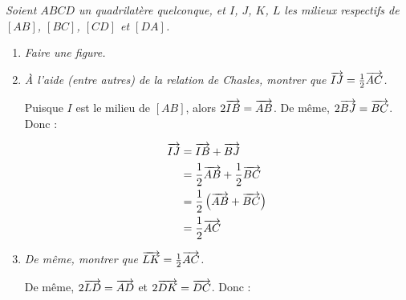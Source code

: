 \documentclass[12pt]{article}
\begin{document}
\pagebreak

\begin{exercice}[Vecteurs]
  \emph{Soient $ABCD$ un quadrilatère quelconque, et $I$, $J$, $K$, $L$ les milieux respectifs de $[AB]$, $\left[ BC \right]$, $\left[ CD \right]$ et $\left[ DA \right]$.}

  \begin{enumerate}
    \item \emph{Faire une figure.}
      \begin{center}
      \end{center}
    \item \emph{À l'aide (entre autres) de la relation de Chasles, montrer que $\overrightarrow{IJ}=\frac{1}{2}\overrightarrow{AC}$.}
      \begin{multicols}{2}
      Puisque $I$ est le milieu de $\left[ AB \right]$, alors $2\overrightarrow{IB}=\overrightarrow{AB}$. De même, $2\overrightarrow{BJ}=\overrightarrow{BC}$. Donc :

      \begin{align*}
      \overrightarrow{IJ} &= \overrightarrow{IB}+\overrightarrow{BJ} \\
      &= \frac{1}{2}\overrightarrow{AB} + \frac{1}{2}\overrightarrow{BC}\\
      &= \frac{1}{2}\left( \overrightarrow{AB}+\overrightarrow{BC} \right)\\
      &=\frac{1}{2}\overrightarrow{AC}
      \end{align*}
    \end{multicols}
    \item 
      \emph{De même, montrer que $\overrightarrow{LK}=\frac{1}{2}\overrightarrow{AC}$.}
      \begin{multicols}{2}
      De même, $2\overrightarrow{LD}=\overrightarrow{AD}$ et $2\overrightarrow{DK}=\overrightarrow{DC}$. Donc :


\end{multicols}
\end{enumerate}
\end{exercice}
\end{document}
